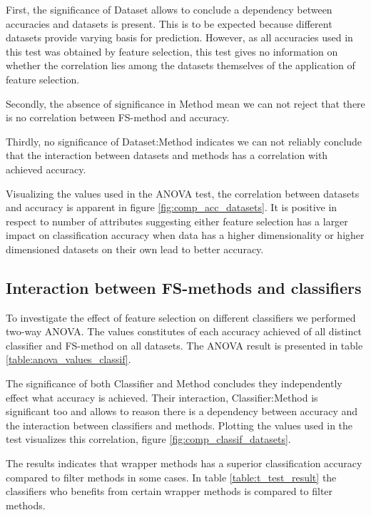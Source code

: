

First, the significance of Dataset allows to conclude a dependency between accuracies and datasets is present. This is to be expected because different datasets provide varying basis for prediction. However, as all accuracies used in this test was obtained by feature selection, this test gives no information on whether the correlation lies among the datasets themselves of the application of feature selection.

Secondly, the absence of significance in Method mean we can not reject that there is no correlation between FS-method and accuracy.

Thirdly, no significance of Dataset:Method indicates we can not reliably conclude that the interaction between datasets and methods has a correlation with achieved accuracy.

Visualizing the values used in the ANOVA test, the correlation between datasets and accuracy is apparent in figure \ref{fig:comp_acc_datasets}. It is positive in respect to number of attributes suggesting either feature selection has a larger impact on classification accuracy when data has a higher dimensionality or higher dimensioned datasets on their own lead to better accuracy.



\subsection{Interaction between FS-methods and classifiers}
\label{sec:fs_methods_classifiers}

To investigate the effect of feature selection on different classifiers we performed two-way ANOVA. The values constitutes of each accuracy achieved of all distinct classifier and FS-method on all datasets. The ANOVA result is presented in table \ref{table:anova_values_classif}.



The significance of both Classifier and Method concludes they independently effect what accuracy is achieved. Their interaction, Classifier:Method is significant too and allows to reason there is a dependency between accuracy and the interaction between classifiers and methods. Plotting the values used in the test visualizes this correlation, figure \ref{fig:comp_classif_datasets}.

The results indicates that wrapper methods has a superior classification accuracy compared to filter methods in some cases. In table \ref{table:t_test_result} the classifiers who benefits from certain wrapper methods is compared to filter methods.

